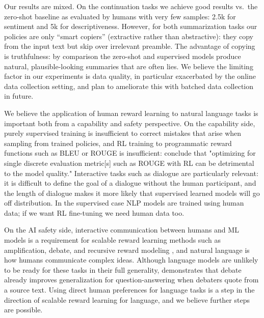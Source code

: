 \documentclass{article}
\begin{document}
Our results are mixed.  On the continuation tasks we achieve good results vs.\ the zero-shot baseline as evaluated by humans with very few samples: 2.5k for sentiment and 5k for descriptiveness.  However, for both summarization tasks our policies are only ``smart copiers'' (extractive rather than abstractive): they copy from the input text but skip over irrelevant preamble.  The advantage of copying is truthfulness: by comparison the zero-shot and supervised models produce natural, plausible-looking summaries that are often lies.  We believe the limiting factor in our experiments is data quality, in particular exacerbated by the online data collection setting, and plan to ameliorate this with batched data collection in future.

We believe the application of human reward learning to natural language tasks is important both from a capability and safety perspective.  On the capability side, purely supervised training is insufficient to correct mistakes that arise when sampling from trained policies, and RL training to programmatic reward functions such as BLEU or ROUGE is insufficient: \citet{paulus2017deep} conclude that "optimizing for single discrete evaluation metric[s] such as ROUGE with RL can be
detrimental to the model quality."  Interactive tasks such as dialogue are particularly relevant: it is difficult to define the goal of a dialogue without the human participant, and the length of dialogue makes it more likely that supervised learned models will go off distribution.  In the supervised case NLP models are trained using human data; if we want RL fine-tuning we need human data too.

On the AI safety side, interactive communication between humans and ML models is a requirement for scalable reward learning methods such as amplification, debate, and recursive reward modeling \citep{christiano2018amplification,irving2018debate,leike2018scalable}, and natural language is how humans communicate complex ideas.  Although language models are unlikely to be ready for these tasks in their full generality, \citet{perez2019convince} demonstrates that debate already improves generalization for question-answering when debaters quote from a source text.
Using direct human preferences for language tasks is a step in the direction of scalable reward learning for language, and we believe further steps are possible.
\end{document}
